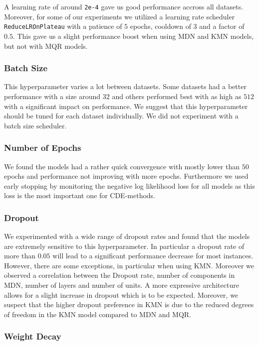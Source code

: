 A learning rate of around \texttt{2e-4} gave us good performance accross all datasets. Moreover, for some of our experiments we utilized a learning rate scheduler \texttt{ReduceLROnPlateau} with a patience of $5$ epochs, cooldown of $3$ and a factor of $0.5$. This gave us a slight performance boost when using MDN and KMN models, but not with MQR models.

\subsubsection{Batch Size}

This hyperparameter varies a lot between datasets. Some datasets had a better performance with a size around $32$ and others performed best with as high as $512$ with a significant impact on performance. We suggest that this hyperparameter should be tuned for each dataset individually. We did not experiment with a batch size scheduler.

\subsubsection{Number of Epochs}

We found the models had a rather quick convergence with mostly lower than $50$ epochs and performance not improving with more epochs. Furthermore we used early stopping by monitoring the negative log likelihood loss for all models as this loss is the most important one for CDE-methods.

\subsubsection{Dropout}

We experimented with a wide range of dropout rates and found that the models are extremely sensitive to this hyperparameter. In particular a dropout rate of more than $0.05$ will lead to a significant performance decrease for most instances. However, there are some exceptions, in particular when using KMN. Moreover we observed a correlation between the Dropout rate, number of components in MDN, number of layers and number of units. A more expressive architecture allows for a slight increase in dropout which is to be expected. Moreover, we suspect that the higher dropout preference in KMN is due to the reduced degrees of freedom in the KMN model compared to MDN and MQR.

\subsubsection{Weight Decay}

